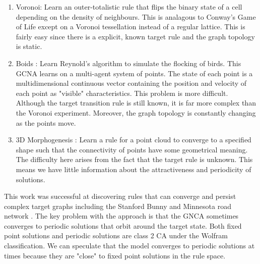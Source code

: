 \begin{enumerate}
  \item Voronoi: Learn an outer-totalistic rule that flips the binary state of a cell depending on the density of neighbours. This is analagous to Conway's Game of Life except on a Voronoi tessellation instead of a regular lattice. This is fairly easy since there is a explicit, known target rule and the graph topology is static. 
  \item Boids : Learn Reynold's algorithm \cite{reynolds1987flocks} to simulate the flocking of birds. This GCNA learns on a multi-agent system of points. The state of each point is a multidimensional continuous vector containing the position and velocity of each point as "visible" characteristics. This problem is more difficult. Although the target transition rule is still known, it is far more complex than the Voronoi experiment. Moreover, the graph topology is constantly changing as the points move.
  \item 3D Morphogenesis : Learn a rule for a point cloud to converge to a specified shape such that the connectivity of points have some geometrical meaning. The difficulty here arises from the fact that the target rule is unknown. This means we have little information about the attractiveness and periodicity of solutions.
\end{enumerate}

This work was successful at discovering rules that can converge and persist complex target graphs including the Stanford Bunny  and Minnesota road network .
The key problem with the approach is that the GNCA sometimes converges to periodic solutions that orbit around the target state. 
Both fixed point solutions and periodic solutions are class 2 CA under the Wolfram classification.
We can speculate that the model converges to periodic solutions at times because they are "close" to fixed point solutions in the rule space.



